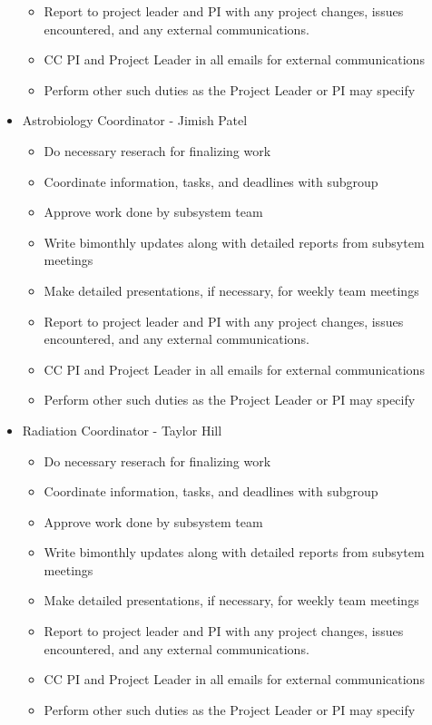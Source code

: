 \begin{itemize}
\begin{itemize}
	\item Report to project leader and PI with any project changes, issues encountered, and any external communications.
	\item CC PI and Project Leader in all emails for external communications
	\item Perform other such duties as the Project Leader or PI may specify
	\end{itemize}
\item Astrobiology Coordinator - Jimish Patel
	\begin{itemize}
	\item Do necessary reserach for finalizing work
	\item Coordinate information, tasks, and deadlines with subgroup
	\item Approve work done by subsystem team
	\item Write bimonthly updates along with detailed reports from subsytem meetings
	\item Make detailed presentations, if necessary, for weekly team meetings
	\item Report to project leader and PI with any project changes, issues encountered, and any external communications.
	\item CC PI and Project Leader in all emails for external communications
	\item Perform other such duties as the Project Leader or PI may specify
	\end{itemize}
\item Radiation Coordinator - Taylor Hill
	\begin{itemize}
	\item Do necessary reserach for finalizing work
	\item Coordinate information, tasks, and deadlines with subgroup
	\item Approve work done by subsystem team
	\item Write bimonthly updates along with detailed reports from subsytem meetings
	\item Make detailed presentations, if necessary, for weekly team meetings
	\item Report to project leader and PI with any project changes, issues encountered, and any external communications.
	\item CC PI and Project Leader in all emails for external communications
	\item Perform other such duties as the Project Leader or PI may specify
	\end{itemize}

\end{itemize}
